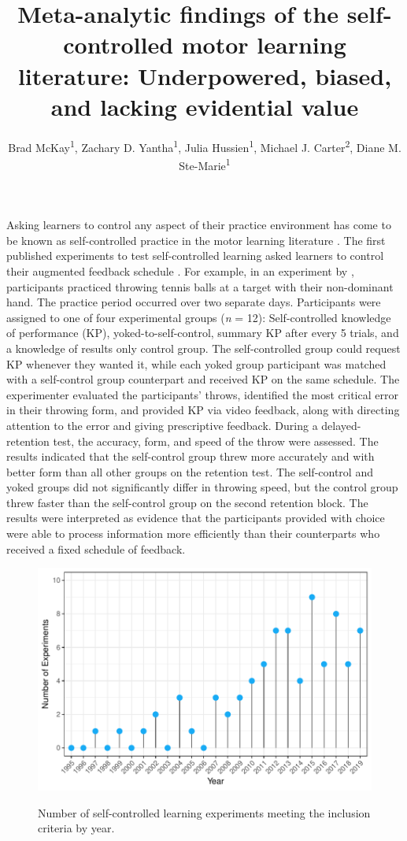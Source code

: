 \documentclass[man,floatsintext,hidelinks]{apa7}
\title{Meta-analytic findings of the self-controlled motor learning literature: Underpowered, biased, and lacking evidential value}
\author{Brad McKay\textsuperscript{1}, Zachary D. Yantha\textsuperscript{1}, Julia Hussien\textsuperscript{1}, Michael J. Carter\textsuperscript{2}, Diane M. Ste-Marie\textsuperscript{1}}
\affiliation{\vspace*{18pt}\textsuperscript{1}\emph{University of Ottawa} \textsuperscript{2}\emph{McMaster University}}
\begin{document}
\maketitle

Asking learners to control any aspect of their practice environment has come to be known as self-controlled practice in the motor learning literature \parencite{Sanli2013-xn,Wulf2016-gf}. The first published experiments to test self-controlled learning asked learners to control their augmented feedback schedule \parencite{Janelle1995-rj,Janelle1997-ht}. For example, in an experiment by \Textcite{Janelle1997-ht}, participants practiced throwing tennis balls at a target with their non-dominant hand. The practice period occurred over two separate days. Participants were assigned to one of four experimental groups (\emph{n} = 12): Self-controlled knowledge of performance (KP), yoked-to-self-control, summary KP after every 5 trials, and a knowledge of results only control group. The self-controlled group could request KP whenever they wanted it, while each yoked group participant was matched with a self-control group counterpart and received KP on the same schedule. The experimenter evaluated the participants’ throws, identified the most critical error in their throwing form, and provided KP via video feedback, along with directing attention to the error and giving prescriptive feedback. During a delayed-retention test, the accuracy, form, and speed of the throw were assessed. The results indicated that the self-control group threw more accurately and with better form than all other groups on the retention test. The self-control and yoked groups did not significantly differ in throwing speed, but the control group threw faster than the self-control group on the second retention block. The results were interpreted as evidence that the participants provided with choice were able to process information more efficiently than their counterparts who received a fixed schedule of feedback.

\begin{figure}[h]
	\caption{Number of self-controlled learning experiments meeting the inclusion criteria by year.}
	\centering
    \includegraphics[]{figs/fig1.pdf}
    \label{fig:Figure1}
\end{figure}
\end{document}
